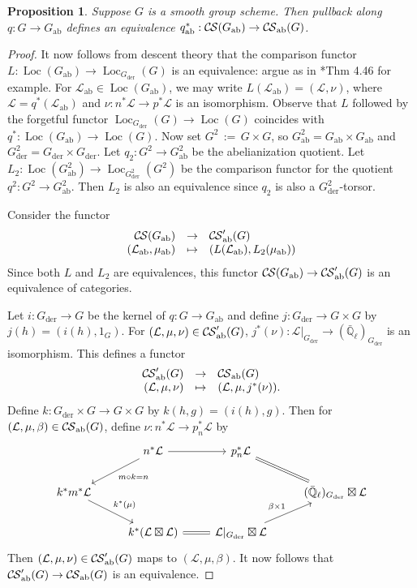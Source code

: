 \documentclass[10pt]{amsart}
\theoremstyle{plain}
\newtheorem{proposition}[theorem]{Proposition}
\theoremstyle{definition}
\newcommand{\EE}{\mathbb{\bar Q}_\ell}
\DeclareMathOperator{\Loc}{Loc}
\newcommand{\der}{_{\operatorname{der}}}
\newcommand{\ab}{_{\operatorname{ab}}}
\newcommand{\ceq}{{\, :=\, }}
\newcommand{\cs}[1]{{\mathcal{#1}}}
\newcommand{\CS}{{\mathcal{C\hskip-0.8pt S}}}
\newcommand{\CSab}{\CS_{\operatorname{ab}}}
\begin{document}
\begin{proposition} \label{prop:CSGabab}
Suppose $G$ is a smooth group scheme.  
Then pullback along $q : G \to G\ab$ defines an equivalence $q\ab^*: \CS(G\ab) \to \CSab(G)$.
\end{proposition}
\begin{proof}
It now follows from descent theory that the comparison functor $L : \Loc(G\ab) \to \Loc_{G\der}(G)$ is an equivalence: argue as in \cite{Vistoli:notes}*{Thm 4.46} for example. 
For $\cs{L}\ab\in \Loc(G\ab)$, we may write $L(\cs{L}\ab) = (\cs{L}, \nu)$, where $\cs{L} = q^*(\cs{L}\ab)$ and $\nu : n^*\cs{L}  \to p^*\cs{L}$ is an isomorphism. 
Observe that $L$ followed by the forgetful functor $\Loc_{G\der}(G)\to \Loc(G)$ coincides with $q^*: \Loc(G\ab)\to \Loc(G)$. 
%
Now set $G^2 \ceq G\times G$, so $G^2\ab =  G\ab \times G\ab$ and $G^2\der = G\der \times G\der$. Let $q_2 : G^2 \to G^2\ab$ be the abelianization quotient.  
Let $L_2 : \Loc(G^2\ab) \to \Loc_{G^2\der}(G^2)$ be the comparison functor for the quotient $q^2  : G^2 \to G^2\ab$.
Then $L_2$ is also an equivalence since $q_2$ is also a $G^2\der$-torsor.

Consider the functor
\[
\begin{array}{rcl}
\CS(G\ab) &\to& \CSab'(G) \\
(\cs{L}\ab,\mu\ab) &\mapsto& (L(\cs{L}\ab), L_2(\mu\ab))
\end{array}
\]
Since both $L$ and $L_2$ are equivalences, this functor $\CS(G\ab) \to \CSab'(G)$ is an equivalence of categories.

Let $i : G\der \to G$ be the kernel of $q:G \to G\ab$ and define $j : G\der \to G\times G$ by $j(h) = (i(h),1_G)$. 
For $(\cs{L},\mu,\nu)\in \CSab'(G)$, $j^*(\nu) : \cs{L}\vert_{G\der} \to (\EE)_{G\der}$ is an isomorphism.
This defines a functor
\[
\begin{array}{rcl}
\CSab'(G) &\to& \CSab(G) \\
(\cs{L},\mu,\nu) &\mapsto& (\cs{L},\mu,j^*(\nu)).
\end{array}
\]
Define $k: G\der\times G\to G\times G$ by $k(h,g) = (i(h),g)$.
Then for $(\cs{L},\mu,\beta) \in \CSab(G)$, define $\nu : n^*\cs{L} \to p_n^*\cs{L}$ by
\[
\begin{tikzcd}
& n^* \cs{L} \arrow{dl}{m\circ k = n} \arrow{r} & p_n^*\cs{L} &  \\ 
k^* m^* \cs{L} \arrow{dr}{k^*(\mu)} &&& (\EE)_{G\der} \boxtimes \cs{L} \arrow[equal]{ul} \\
& k^*(\cs{L}\boxtimes\cs{L}) \arrow[equal]{r} & \cs{L}\vert_{G\der}\boxtimes \cs{L} \arrow{ur}{\beta\times 1}
\end{tikzcd}
\]
Then $(\cs{L},\mu,\nu)\in \CSab'(G)$ maps to $(\cs{L},\mu,\beta)$.
It now follows that $\CSab'(G) \to \CSab(G)$ is an equivalence.
\end{proof}
\end{document}

